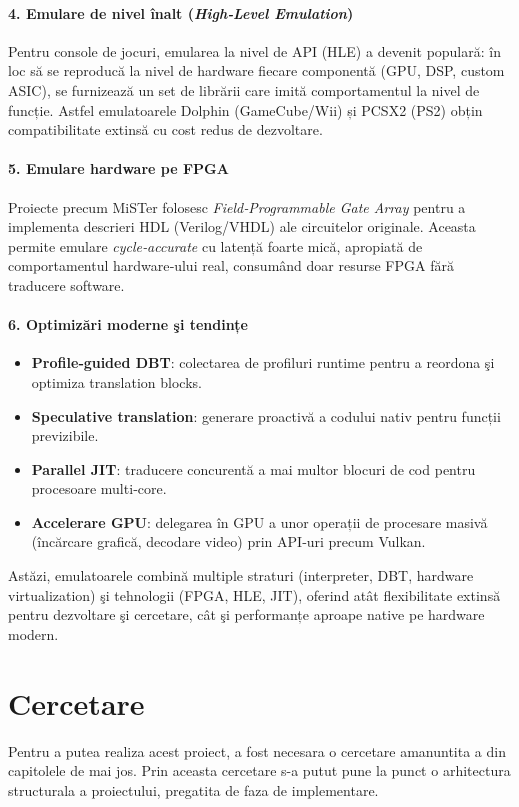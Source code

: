 \documentclass[titlepage,12pt]{article}
\begin{document}
\paragraph{4. Emulare de nivel înalt (\emph{High‑Level Emulation})}  
Pentru console de jocuri, emularea la nivel de API (HLE) a devenit populară: în loc să se reproducă la nivel de hardware fiecare componentă (GPU, DSP, custom ASIC), se furnizează un set de librării care imită comportamentul la nivel de funcție. Astfel emulatoarele Dolphin (GameCube/Wii) și PCSX2 (PS2) obțin compatibilitate extinsă cu cost redus de dezvoltare.

\paragraph{5. Emulare hardware pe FPGA}  
Proiecte precum MiSTer folosesc \emph{Field‑Programmable Gate Array} pentru a implementa descrieri HDL (Verilog/VHDL) ale circuitelor originale. Aceasta permite emulare \emph{cycle‑accurate} cu latență foarte mică, apropiată de comportamentul hardware‑ului real, consumând doar resurse FPGA fără traducere software.

\paragraph{6. Optimizări moderne şi tendințe}  
\begin{itemize}
  \item \textbf{Profile‑guided DBT}: colectarea de profiluri runtime pentru a reordona şi optimiza translation blocks.  
  \item \textbf{Speculative translation}: generare proactivă a codului nativ pentru funcții pre­vizibile.  
  \item \textbf{Parallel JIT}: traducere concurentă a mai multor blocuri de cod pentru procesoare multi‑core.  
  \item \textbf{Accelerare GPU}: delegarea în GPU a unor operații de procesare masivă (încărcare grafică, decodare video) prin API‑uri precum Vulkan.  
\end{itemize}

Astăzi, emulatoarele combină multiple straturi (interpreter, DBT, hardware virtualization) şi tehnologii (FPGA, HLE, JIT), oferind atât flexibilitate extinsă pentru dezvoltare şi cercetare, cât şi performanțe aproape native pe hardware modern.

\section{Cercetare}
Pentru a putea realiza acest proiect, a fost necesara o cercetare amanuntita a din capitolele de mai jos.
Prin aceasta cercetare s-a putut pune la punct o arhitectura structurala a proiectului, pregatita de faza de implementare.
\end{document}
